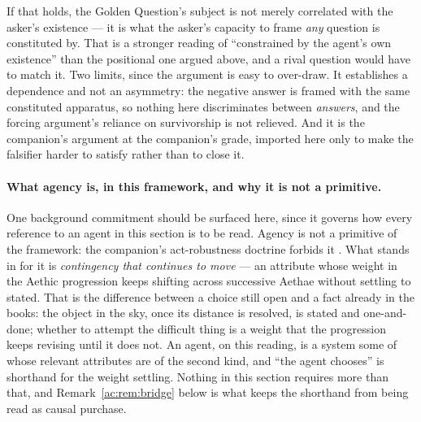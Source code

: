 \documentclass[11pt]{article}
\numberwithin{equation}{section}
\theoremstyle{plain}
\theoremstyle{definition}
\theoremstyle{remark}
\begin{document}
If that holds, the Golden Question's subject is not merely correlated
with the asker's existence --- it is what the asker's capacity to frame
\emph{any} question is constituted by. That is a stronger reading of
``constrained by the agent's own existence'' than the positional one
argued above, and a rival question would have to match it. Two limits, since the argument is easy to over-draw. It establishes a
dependence and not an asymmetry: the negative answer is framed with the
same constituted apparatus, so nothing here discriminates between
\emph{answers}, and the forcing argument's reliance on survivorship is
not relieved. And it is the companion's argument at the companion's
grade, imported here only to make the falsifier harder to satisfy rather
than to close it.

\paragraph{What agency is, in this framework, and why it is not a
primitive.}\label{ac:rem:agencyisnot}
One background commitment should be surfaced here, since it governs how
every reference to an agent in this section is to be read. Agency is not
a primitive of the framework: the companion's act-robustness doctrine
forbids it \cite{Aethus}. What stands in for it is \emph{contingency that
continues to move} --- an attribute whose weight in the Aethic
progression keeps shifting across successive Aethae without settling to
stated. That is the difference between a choice still open and a fact
already in the books: the object in the sky, once its distance is
resolved, is stated and one-and-done; whether to attempt the difficult
thing is a weight that the progression keeps revising until it does not.
An agent, on this reading, is a system some of whose relevant attributes
are of the second kind, and ``the agent chooses'' is shorthand for the
weight settling. Nothing in this section requires more than that, and
Remark~\ref{ac:rem:bridge} below is what keeps the shorthand from being read
as causal purchase.
\end{document}

